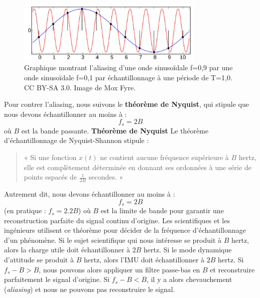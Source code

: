 \begin{figure}[H] %
    \centering
    \includegraphics[width=0.8\textwidth]{figures/6-18.jpg}
    \caption{Graphique montrant l'aliasing d'une onde sinusoïdale f=0,9 par une onde sinusoïdale f=0,1 par échantillonnage à une période de T=1,0. CC BY-SA 3.0. Image de Mox Fyre.}
    \label{fig:communication2}
\end{figure}
Pour contrer l'aliasing, nous suivons le \textbf{théorème de Nyquist}, qui stipule que nous devons échantillonner au moins à :
\[
f_s = 2B
\]
où \( B \) est la bande passante.
\medskip
\noindent \textbf{Théorème de Nyquist}  
Le théorème d'échantillonnage de Nyquist-Shannon stipule :
\begin{quote}
    « Si une fonction \( x(t) \) ne contient aucune fréquence supérieure à \( B \) hertz, elle est complètement déterminée en donnant ses ordonnées à une série de points espacés de \( \frac{1}{2B} \) secondes. »
\end{quote}
Autrement dit, nous devons échantillonner au moins à :
\[
f_s = 2B
\]
(en pratique : \( f_s = 2.2B \)) où \( B \) est la limite de bande pour garantir une reconstruction parfaite du signal continu d'origine.  
Les scientifiques et les ingénieurs utilisent ce théorème pour décider de la fréquence d'échantillonnage d'un phénomène.  
Si le sujet scientifique qui nous intéresse se produit à \( B \) hertz, alors la charge utile doit échantillonner à \( 2B \) hertz.  
Si le mode dynamique d'attitude se produit à \( B \) hertz, alors l'IMU doit échantillonner à \( 2B \) hertz.
Si \( f_s - B > B \), nous pouvons alors appliquer un filtre passe-bas en \( B \) et reconstruire parfaitement le signal d'origine.
Si \( f_s - B < B \), il y a alors chevauchement (\textit{aliasing}) et nous ne pouvons pas reconstruire le signal.
